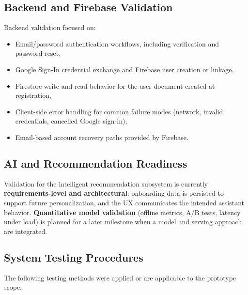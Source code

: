 \subsection{Backend and Firebase Validation}

Backend validation focused on:

\begin{itemize}
    \item Email/password authentication workflows, including verification and password reset,
    \item Google Sign-In credential exchange and Firebase user creation or linkage,
    \item Firestore write and read behavior for the user document created at registration,
    \item Client-side error handling for common failure modes (network, invalid credentials, cancelled Google sign-in),
    \item Email-based account recovery paths provided by Firebase.
\end{itemize}

\subsection{AI and Recommendation Readiness}

Validation for the intelligent recommendation subsystem is currently \textbf{requirements-level
and architectural}: onboarding data is persisted to support future personalization, and
the UX communicates the intended assistant behavior. \textbf{Quantitative model validation}
(offline metrics, A/B tests, latency under load) is planned for a later milestone when a
model and serving approach are integrated.

\subsection{System Testing Procedures}

The following testing methods were applied or are applicable to the prototype scope:

